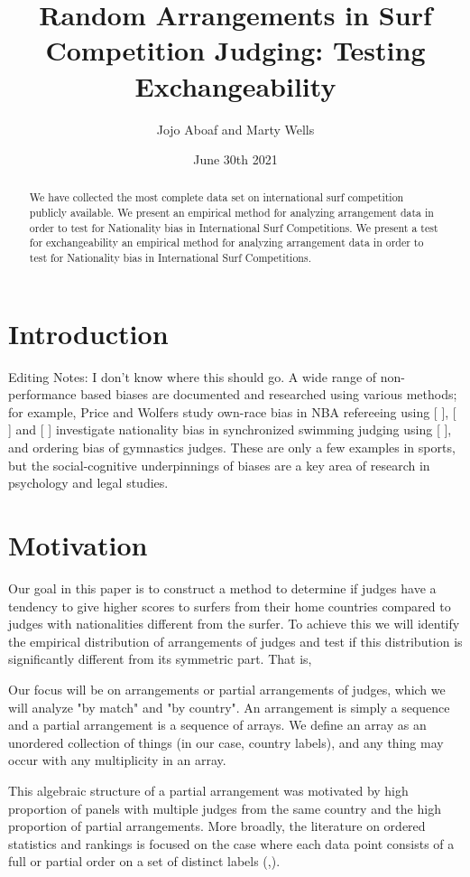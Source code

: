 \documentclass{article}
\title{Random Arrangements in Surf Competition Judging: Testing Exchangeability}
\author{Jojo Aboaf and Marty Wells}
\date{June 30th 2021}
\begin{document}
\maketitle
\tableofcontents

\begin{abstract}
We have collected the most complete data set on international surf competition publicly available.
We present an empirical method for analyzing arrangement data in order to test for Nationality bias in International Surf Competitions. 
We present a test for exchangeability  an empirical method for analyzing arrangement data in order to test for Nationality bias in International Surf Competitions. 

\end{abstract}
\section{Introduction}
Editing Notes: I don't know where this should go.
A wide range of non-performance based biases are documented and researched using various methods; for example, Price and Wolfers study own-race bias in NBA refereeing using [        ], [   ] and [  ] investigate nationality bias in synchronized swimming judging using [       ], and ordering bias of gymnastics judges. These are only a few examples in sports, but the social-cognitive underpinnings of biases are a key area of research in psychology and legal studies.

\section{Motivation}
Our goal in this paper is to construct a method to determine if judges have a tendency to give higher scores to surfers from their home countries compared to judges with nationalities different from the surfer. To achieve this we will identify the empirical distribution of arrangements of judges and test if this distribution is significantly different from its symmetric part. That is, 

Our focus will be on arrangements or partial arrangements of judges, which we will analyze "by match" and "by country". An arrangement is simply a sequence and a partial arrangement is a sequence of arrays. We define an array as an unordered collection of things (in our case, country labels), and any thing may occur with any multiplicity in an array.

This algebraic structure of a partial arrangement was motivated by high proportion of panels with multiple judges from the same country and the high proportion of partial arrangements. More broadly, the literature on ordered statistics and rankings is focused on the case where each data point consists of a full or partial order on a set of distinct labels (\cite{LebMao08},\cite{FliVer93}).
\end{document}
